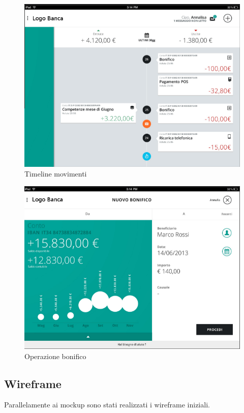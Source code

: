 \begin{figure}[!htbp]
\centering
\includegraphics[scale=0.7]{immagini_mockup/timeline.png}
\caption{Timeline movimenti}
\end{figure}

\begin{figure}[!h]
\centering
\includegraphics[scale=0.7]{immagini_mockup/bonifico.png}
\caption{Operazione bonifico}
\end{figure}

\newpage
\subsection{Wireframe}
Parallelamente ai mockup sono stati realizzati i wireframe iniziali. 

